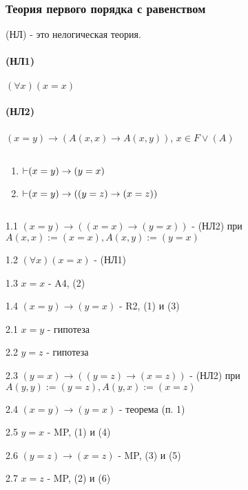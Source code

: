 

\title{}
\author{Козырнов Александр Дмитриевич, ИУ7-32Б}
\date{\today}



\subsubsection{Теория первого порядка с равенством}

(НЛ) - это нелогическая теория.

\paragraph*{(НЛ1)} $(\forall x)(x = x)$

\paragraph*{(НЛ2)} $(x = y) \to (A(x, x) \to A(x,y))$, $x \in F \lor (A)$


\begin{theorem} ${}$\newline
\begin{enumerate}
    \item $\operatorname{\vdash} (x = y) \to (y = x)$
    \item $\operatorname{\vdash} (x = y) \to ((y = z) \to (x = z))$
\end{enumerate}
\end{theorem}

\begin{myproof}
    ${}$\newline

1.1 $(x = y) \to ((x = x) \to (y = x))$ - (НЛ2) при $A(x,x) := (x = x), A(x,y) := (y = x)$

1.2  $(\forall x)(x = x)$ - (НЛ1)

1.3 $x = x$ - A4, (2)

1.4  $(x = y) \to (y = x)$ - R2, (1) и (3)

\medskip

2.1 $x = y$ - гипотеза

2.2  $y = z$ - гипотеза

2.3  $(y = x) \to ((y = z) \to (x = z))$ - (НЛ2) при $A(y,y) := (y = z), A(y,x) := (x = z)$

2.4  $(x = y) \to (y = x)$ - теорема (п. 1)

2.5 $y = x$ - MP, (1) и (4)

2.6  $(y = z) \to (x = z)$ - MP, (3) и (5)

2.7 $x = z$ - MP, (2) и (6)
\end{myproof}

